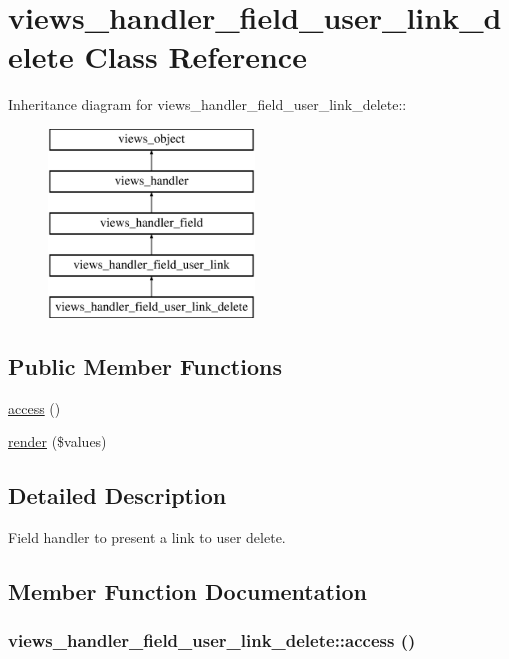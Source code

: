 \hypertarget{classviews__handler__field__user__link__delete}{
\section{views\_\-handler\_\-field\_\-user\_\-link\_\-delete Class Reference}
\label{classviews__handler__field__user__link__delete}
}
Inheritance diagram for views\_\-handler\_\-field\_\-user\_\-link\_\-delete::\begin{figure}[H]
\begin{center}
\leavevmode
\includegraphics[height=5cm]{classviews__handler__field__user__link__delete}
\end{center}
\end{figure}
\subsection*{Public Member Functions}
\begin{CompactItemize}
\item 
\hyperlink{classviews__handler__field__user__link__delete_2b7406dc052b9c2a6970ac45344c6635}{access} ()
\item 
\hyperlink{classviews__handler__field__user__link__delete_8f298b2f0f6edd91efb2c38e6bec03d9}{render} (\$values)
\end{CompactItemize}


\subsection{Detailed Description}
Field handler to present a link to user delete. 

\subsection{Member Function Documentation}
\hypertarget{classviews__handler__field__user__link__delete_2b7406dc052b9c2a6970ac45344c6635}{
\subsubsection[{access}]{\setlength{\rightskip}{0pt plus 5cm}views\_\-handler\_\-field\_\-user\_\-link\_\-delete::access ()}}
\label{classviews__handler__field__user__link__delete_2b7406dc052b9c2a6970ac45344c6635}


